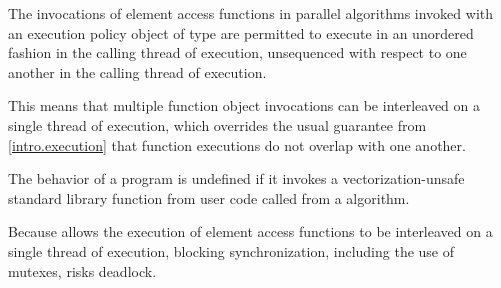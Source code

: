\pnum
The invocations of element access functions in parallel algorithms invoked with
an execution policy object of type 
are permitted to execute in an unordered fashion
in the calling thread of execution,
unsequenced with respect to one another in the calling thread of execution.
\begin{note}
This means that multiple function object invocations
can be interleaved on a single thread of execution,
which overrides the usual guarantee from \ref{intro.execution}
that function executions do not overlap with one another.
\end{note}
The behavior of a program is undefined if
it invokes a vectorization-unsafe standard library function
from user code
called from a  algorithm.
\begin{note}
Because  allows
the execution of element access functions
to be interleaved on a single thread of execution,
blocking synchronization, including the use of mutexes, risks deadlock.
\end{note}


